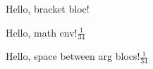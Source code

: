 \documentclass{article}
\begin{document}
Hello, { bracket bloc! }


Hello, math env!$\frac{1}{34}$


Hello, space between arg blocs!$\frac{1} {34}$
\end{document}
